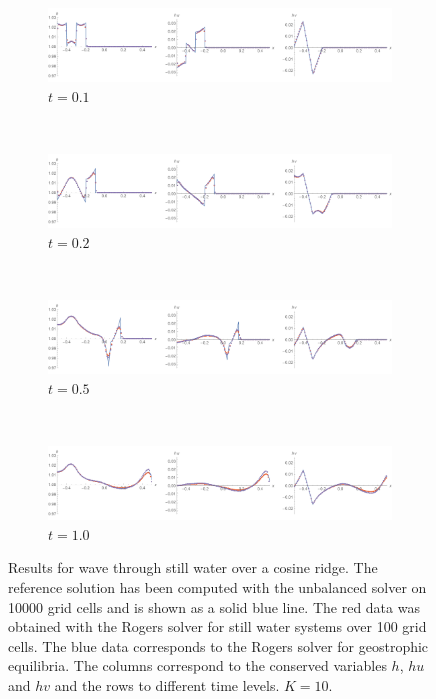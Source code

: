 \begin{figure}
  \centering
  \begin{subfigure}{\textwidth}
    \includegraphics[width=\textwidth]{diagrams/results-wave-rog-1}
    \caption{$t = 0.1$}
    \label{fig:results-wave-rog-1}
  \end{subfigure} \\
  \begin{subfigure}{\textwidth}
    \includegraphics[width=\textwidth]{diagrams/results-wave-rog-2}
    \caption{$t = 0.2$}
    \label{fig:results-wave-rog-2}
  \end{subfigure} \\
  \begin{subfigure}{\textwidth}
    \includegraphics[width=\textwidth]{diagrams/results-wave-rog-5}
    \caption{$t = 0.5$}
    \label{fig:results-wave-rog-5}
  \end{subfigure} \\
  \begin{subfigure}{\textwidth}
    \includegraphics[width=\textwidth]{diagrams/results-wave-rog-10}
    \caption{$t = 1.0$}
    \label{fig:results-wave-rog-10}
  \end{subfigure}
  \caption{Results for wave through still water over a cosine ridge. The reference solution has been computed with the unbalanced solver on 10000 grid cells and is shown as a solid blue line. The red data was obtained with the Rogers solver for still water systems over 100 grid cells. The blue data corresponds to the Rogers solver for geostrophic equilibria. The columns correspond to the conserved variables $h$, $hu$ and $hv$ and the rows to different time levels. $K = 10$.}
  \label{fig:results-wave-rog}
\end{figure}


